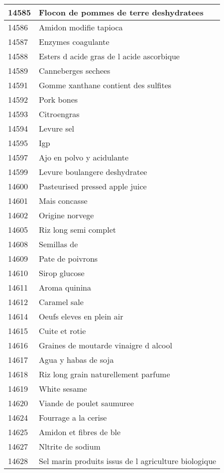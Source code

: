 \begin{longtable}{|l|l|}
14585 & Flocon de pommes de terre deshydratees \\ \hline 
14586 & Amidon modifie tapioca \\ \hline 
14587 & Enzymes coagulante \\ \hline 
14588 & Esters d acide gras de l acide ascorbique \\ \hline 
14589 & Canneberges sechees \\ \hline 
14591 & Gomme xanthane contient des sulfites \\ \hline 
14592 & Pork bones \\ \hline 
14593 & Citroengras \\ \hline 
14594 & Levure sel \\ \hline 
14595 & Igp \\ \hline 
14597 & Ajo en polvo y acidulante \\ \hline 
14599 & Levure boulangere deshydratee \\ \hline 
14600 & Pasteurised pressed apple juice \\ \hline 
14601 & Mais concasse \\ \hline 
14602 & Origine norvege \\ \hline 
14605 & Riz long semi complet \\ \hline 
14608 & Semillas de \\ \hline 
14609 & Pate de poivrons \\ \hline 
14610 & Sirop glucose \\ \hline 
14611 & Aroma quinina \\ \hline 
14612 & Caramel sale \\ \hline 
14614 & Oeufs eleves en plein air \\ \hline 
14615 & Cuite et rotie \\ \hline 
14616 & Graines de moutarde vinaigre d alcool \\ \hline 
14617 & Agua y habas de soja \\ \hline 
14618 & Riz long grain naturellement parfume \\ \hline 
14619 & White sesame \\ \hline 
14620 & Viande de poulet saumuree \\ \hline 
14624 & Fourrage a la cerise \\ \hline 
14625 & Amidon et fibres de ble \\ \hline 
14627 & Nltrite de sodium \\ \hline 
14628 & Sel marin produits issus de l agriculture biologique \\ \hline 

\end{longtable}
